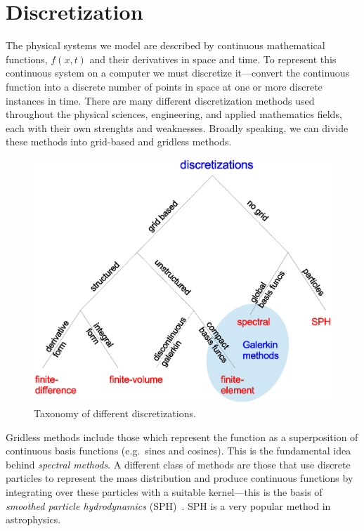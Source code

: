 \section{Discretization}

The physical systems we model are described by continuous mathematical
functions, $f(x,t)$ and their derivatives in space and time.  To
represent this continuous system on a computer we must discretize
it---convert the continuous function into a discrete number of points
in space at one or more discrete instances in time.
There are many different discretization methods used throughout the
physical sciences, engineering, and applied mathematics fields, each
with their own strenghts and weaknesses.  Broadly speaking, we can
divide these methods into grid-based and gridless methods.  

\begin{figure}[h]
\centering
\includegraphics[width=\linewidth]{discretizations}
\caption{\label{fig:disc} Taxonomy of different discretizations.}
\end{figure}

Gridless methods include those which represent the function as a
superposition of continuous basis functions (e.g.\ sines and cosines).
This is the fundamental idea behind {\em spectral methods}.  A different
class of methods are those that use discrete particles to represent the
mass distribution and produce continuous functions by integrating
over these particles with a suitable kernel---this is the basis of
{\em smoothed particle hydrodynamics} (SPH)~\cite{SPH}.  SPH is a very popular
method in astrophysics.

